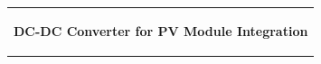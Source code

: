 %
\begin{titlepage}
\vspace*{\fill}
  \addtolength{\hoffset}{0.5\evensidemargin-0.5\oddsidemargin} %
  \noindent%
  {\color{white}\colorbox{aaublue}{\begin{tabular}{@{}p{\textwidth}@{}}
    \begin{center}
    \Huge{\textbf{
      DC-DC Converter for PV Module Integration%
    }}
    \end{center}
    \begin{center}
      \Large{
}
\end{center}
\end{tabular}}}
\end{titlepage}
